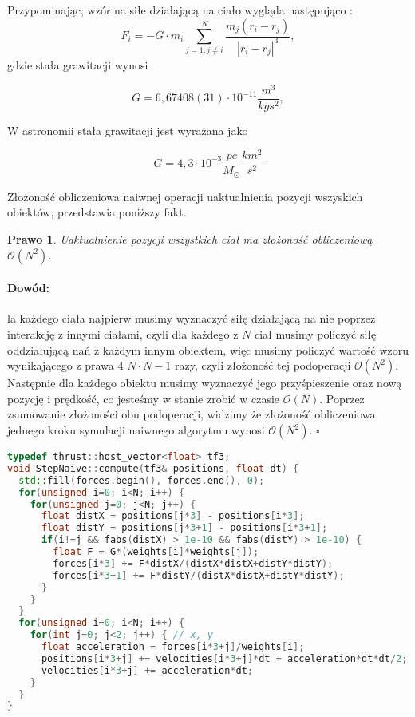\documentclass[14pt,twoside,a4paper]{article}
\newtheorem{theorem}{Prawo}
\newenvironment{myproof}[2] {\paragraph{Dowód:}}{\hfill$\square$}
\newcommand\tab[1][1cm]{\hspace*{#1}}
\begin{document}
Przypominając, wzór na siłe działającą na ciało wygląda następująco :\\
$$F_i = -G\cdot m_i \sum_{j=1, j\neq i}^N \frac{m_j(r_i - r_j)}{|r_i - r_j|^3},$$ 
gdzie stała grawitacji wynosi
\begin{center}
$$G = 6,67408(31)\cdot 10^{-11} \frac{m^{3}}{kg s^2},$$
\end{center}
W astronomii stała grawitacji jest wyrażana jako 
\begin{center}
$$G = 4,3\cdot 10^{-3} \frac{pc}{M_{\odot}} \frac{km^2}{s^2}$$
\end{center}
Złożoność obliczeniowa naiwnej operacji uaktualnienia pozycji wszyskich obiektów, przedstawia poniższy fakt.

\begin{theorem}
Uaktualnienie pozycji wszystkich ciał ma złożoność obliczeniową $\mathcal{O}(N^{2})$.
\end{theorem}

\begin{myproof}

\tab Dla każdego ciała najpierw musimy wyznaczyć siłę działającą na nie poprzez interakcję z innymi ciałami, czyli dla każdego z $N$ ciał musimy policzyć siłę oddziałującą nań z każdym innym obiektem, więc musimy policzyć wartość wzoru wynikającego z prawa $4$ $N\cdot N-1$ razy, czyli złożoność tej podoperacji $\mathcal{O}(N^{2})$. 
Następnie dla każdego obiektu musimy wyznaczyć jego przyśpieszenie oraz nową pozycję i prędkość, co jesteśmy w stanie zrobić w czasie $\mathcal{O}(N)$.
Poprzez zsumowanie złożoności obu podoperacji, widzimy że złożoność obliczeniowa jednego kroku symulacji naiwnego algorytmu wynosi $\mathcal{O}(N^{2})$.
\end{myproof}



\begin{lstlisting}[language=C++, frame=single, framerule=2pt, caption=uaktualnienie pozycji ciał]
typedef thrust::host_vector<float> tf3;
void StepNaive::compute(tf3& positions, float dt) {
  std::fill(forces.begin(), forces.end(), 0);
  for(unsigned i=0; i<N; i++) {
    for(unsigned j=0; j<N; j++) {
      float distX = positions[j*3] - positions[i*3];
      float distY = positions[j*3+1] - positions[i*3+1];
      if(i!=j && fabs(distX) > 1e-10 && fabs(distY) > 1e-10) {
        float F = G*(weights[i]*weights[j]);
        forces[i*3] += F*distX/(distX*distX+distY*distY);
        forces[i*3+1] += F*distY/(distX*distX+distY*distY);
      }
    }
  }
  for(unsigned i=0; i<N; i++) {
    for(int j=0; j<2; j++) { // x, y
      float acceleration = forces[i*3+j]/weights[i];
      positions[i*3+j] += velocities[i*3+j]*dt + acceleration*dt*dt/2;
      velocities[i*3+j] += acceleration*dt;
    }
  }
}
\end{lstlisting}
\end{document}
